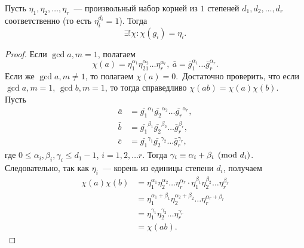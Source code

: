 \begin{nlemma}
\label{lm:II-1}
    Пусть $\eta_1, \eta_2, \dots, \eta_r$ --- произвольный набор корней из $1$ степеней $d_1, d_2, \dots, d_r$ соответственно (то есть $\eta_i^{d_i} = 1$). Тогда 
    \[
        \exists! \chi\colon \chi\left(g_i\right) = \eta_i.
    \]
\end{nlemma}
\begin{proof}
    Если $\gcd{a, m} = 1$, полагаем 
    \[
        \chi(a) = \eta_1^{\alpha_1} \eta_21^{\alpha_2} \dots \eta_r^{\alpha_r}, \ \bar{a} = \bar{g}_1^{\alpha_1} \dots \bar{g}_r^{\alpha_r}.
    \]
    Если же $\gcd{a, m} \ne 1$, то полагаем $\chi(a) = 0$.~\newline Достаточно проверить, что если $\gcd{a, m} = 1$, $\gcd{b, m} = 1$, то тогда справедливо $\chi(ab) = \chi(a)\chi(b)$.~\newline
    Пусть 
    \begin{align*}
        \bar{a} &= \bar{g_1}^{\alpha_1} \bar{g_2}^{\alpha_2} \dots \bar{g_r}^{\alpha_r}, \\
        \bar{b} &= \bar{g_1}^{\beta_1} \bar{g_2}^{\beta_2} \dots \bar{g}_r^{\beta_r}, \\
        \bar{c} &= \bar{g_1}^{\gamma_1} \bar{g_2}^{\gamma_2} \dots \bar{g}_r^{\gamma_r},
    \end{align*}
    где $0 \le \alpha_i, \beta_i, \gamma_i \le d_1 - 1$, $i = 1, 2, \dots r$.
    Тогда $\gamma_i \equiv \alpha_i + \beta_i \pmod {d_i}$. Следовательно, так как $\eta_i$ --- корень из единицы степени $d_i$, получаем
    \begin{align*}
        \chi(a)\chi(b) &= \eta_1^{\alpha_1} \eta_2^{\alpha_2} \dots \eta_r^{\alpha_r} \cdot \eta_1^{\beta_1} \eta_2^{\beta_2} \dots \eta_r^{\beta_r} \\
        &= \eta_1^{\alpha_1 + \beta_1} \eta_2^{\alpha_2 + \beta_2} \dots \eta_r^{\alpha_r + \beta_r} \\
        &= \eta_1^{\gamma_1} \eta_2^{\gamma_2} \dots \eta_r^{\gamma_r} \\
        &= \chi(ab).
    \end{align*}
\end{proof}

